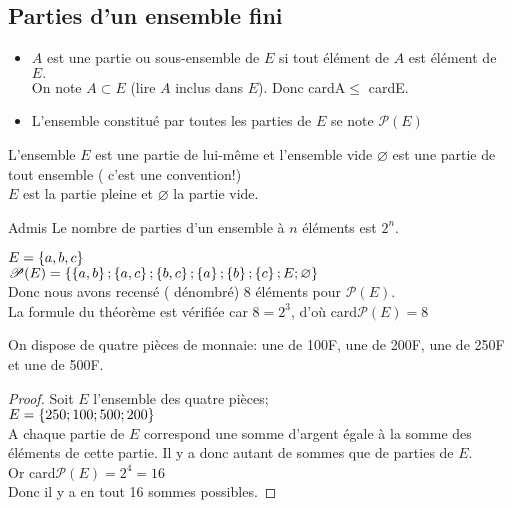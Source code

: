 \subsection*{Parties d'un ensemble fini}
\begin{itemize}
\item $ A $ est une partie ou sous-ensemble de $ E $ si tout élément de $ A $ est élément de $ E. $\\ On note $ A \subset E $ (lire $ A$ inclus dans $E $). Donc  cardA$ \leq $ cardE.
\item L'ensemble constitué par toutes les parties de $ E $ se note  $ \mathscr{P}(E) $
\end{itemize}
\begin{remark}
L'ensemble $ E $ est une partie de lui-même et l'ensemble vide $ \varnothing $ est une partie de tout ensemble ( c'est une convention!)\\
$ E $ est la partie pleine et $ \varnothing $ la partie vide.
\end{remark}
\begin{theorem}{Admis}
Le nombre de parties d'un ensemble à $ n $ éléments est $ 2^{n}. $
\end{theorem}
\begin{example}
$ E= \left\{a, b, c\right\}$ \\
$ \mathscr{P}(E)= \left\{ \left\{a, b\right\};\left\{a,c\right\};\left\{b,c\right\}                            ;\left\{a\right\};\left\{b\right\};\left\{c\right\}; E ; \varnothing \right\}$\\
Donc nous avons recensé ( dénombré)  8  éléments pour $ \mathscr{P}(E) $. \\ La formule du théorème est vérifiée car $ 8= 2^{3} $, d'où card$ \mathscr{P}(E)=8 $
\end{example}
\begin{exercice}
On dispose de quatre pièces de monnaie: une de 100F, une de 200F, une de 250F et une de 500F.
\end{exercice}

\begin{proof}
 Soit $ E $ l'ensemble des quatre pièces;\\
$ E = \left\{250; 100; 500; 200\right\}$\\
A chaque partie de $ E $ correspond une somme d'argent égale à la somme des éléments de cette partie. Il y a donc autant de sommes que de parties de $ E. $\\
Or  card$ \mathscr{P}(E)=2^{4}=16 $\\
Donc il y a en tout 16 sommes possibles.
\end{proof}

